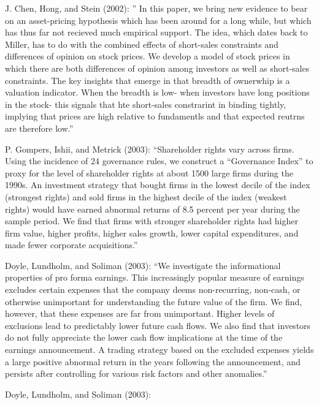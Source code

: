 \documentclass[
  letterpaper,
  DIV=11,
  numbers=noendperiod]{scrreprt}
\begin{document}
J. Chen, Hong, and Stein (2002): '' In this paper, we bring new evidence
to bear on an asset-pricing hypothesis which has been around for a long
while, but which has thus far not recieved much empirical support. The
idea, which dates back to Miller, has to do with the combined effects of
short-sales constraints and differences of opinion on stock prices. We
develop a model of stock prices in which there are both differences of
opinion among investors as well as short-sales constraints. The key
insights that emerge in that breadth of ownerwhip is a valuation
indicator. When the breadth is low- when investors have long positions
in the stock- this signals that hte short-sales constrarint in binding
tightly, implying that prices are high relative to fundamentls and that
expected reutrns are therefore low.''

P. Gompers, Ishii, and Metrick (2003): ``Shareholder rights vary across
firms. Using the incidence of 24 governance rules, we construct a
``Governance Index'' to proxy for the level of shareholder rights at
about 1500 large firms during the 1990s. An investment strategy that
bought firms in the lowest decile of the index (strongest rights) and
sold firms in the highest decile of the index (weakest rights) would
have earned abnormal returns of 8.5 percent per year during the sample
period. We find that firms with stronger shareholder rights had higher
firm value, higher profits, higher sales growth, lower capital
expenditures, and made fewer corporate acquisitions.''

Doyle, Lundholm, and Soliman (2003): ``We investigate the informational
properties of pro forma earnings. This increasingly popular measure of
earnings excludes certain expenses that the company deems non-recurring,
non-cash, or otherwise unimportant for understanding the future value of
the firm. We find, however, that these expenses are far from
unimportant. Higher levels of exclusions lead to predictably lower
future cash flows. We also find that investors do not fully appreciate
the lower cash flow implications at the time of the earnings
announcement. A trading strategy based on the excluded expenses yields a
large positive abnormal return in the years following the announcement,
and persists after controlling for various risk factors and other
anomalies.''

Doyle, Lundholm, and Soliman (2003):
\end{document}
